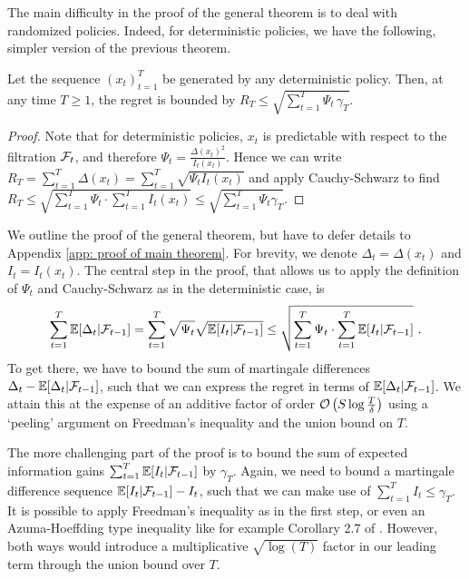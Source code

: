 The main difficulty in the proof of the general theorem is to deal with randomized policies. Indeed, for deterministic policies, we have the following, simpler version of the previous theorem.
\begin{theorem}\label{thm: general regret bound deterministic}
	Let the sequence $(x_t)_{t=1}^T$ be generated by any deterministic policy. Then, at any time $T \geq 1$, the regret is bounded by $R_T \leq  \sqrt{\sum_{t=1}^T \Psi_t \, \gamma_T}$.

\end{theorem}
\begin{proof}
	Note that for deterministic policies, $x_t$ is predictable with respect to the filtration $\mathcal{F}_t$, and therefore $\Psi_t = \frac{\Delta(x_t)^2}{I_t(x_t)}$. Hence we can write $R_T = \sum_{t=1}^T \Delta(x_t) = \sum_{t=1}^T \sqrt{\Psi_t I_t(x_t)}$ and apply Cauchy-Schwarz to find $R_T \leq  \sqrt{\sum_{t=1}^T \Psi_t \cdot \sum_{t=1}^T I_t(x_t)} \leq  \sqrt{\sum_{t=1}^T \Psi_t \gamma_T}$.
\end{proof}
We outline the proof of the general theorem, but have to defer details to Appendix \ref{app: proof of main theorem}. For brevity, we denote $\Delta_t = \Delta(x_t)$ and  $I_t = I_t(x_t)$. The central step in the proof, that allows us to apply the definition of $\Psi_t$ and Cauchy-Schwarz as in the deterministic case, is
\begin{align*}
\sum_{t=1}^T \mathbb{E}[\Delta_t|\mathcal{F}_{t-1}] = \sum_{t=1}^T \sqrt{\Psi_t} \sqrt{\mathbb{E}[I_t |\mathcal{F}_{t-1}]} \leq \sqrt{\sum_{t=1}^T \Psi_t \cdot \sum_{t=1}^T \mathbb{E}[I_t|\mathcal{F}_{t-1}]} \text{ .}
\end{align*}
To get there, we have to bound the sum of martingale differences $\Delta_t - \mathbb{E}[\Delta_t|\mathcal{F}_{t-1}]$, such that we can express the regret in terms of $\mathbb{E}[\Delta_t|\mathcal{F}_{t-1}]$. We attain this at the expense of an additive factor of order $\mathcal{O}\left(S \log \frac{T}{\delta} \right)$ using a `peeling' argument on Freedman's inequality and the union bound on $T$.

The more challenging part of the proof is to bound the sum of expected information gains $\sum_{t=1}^T \mathbb{E}[I_t|\mathcal{F}_{t-1}]$ by $\gamma_T$. Again, we need to bound a martingale difference sequence $\mathbb{E}[I_t|\mathcal{F}_{t-1}] - I_t$,  such that we can make use of $\sum_{t=1}^T I_t \leq \gamma_T$. It is possible to apply Freedman's inequality as in the first step, or even an Azuma-Hoeffding type inequality like for example Corollary 2.7 of \cite{FanExponentialinequalitiesmartingales2015}. However, both ways would introduce a multiplicative $\sqrt{\log(T)}$ factor in our leading term through the union bound over $T$. 

